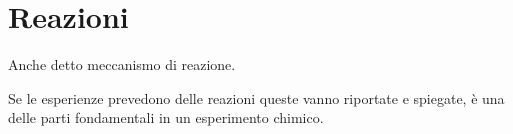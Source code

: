 \section{Reazioni}
Anche detto meccanismo di reazione.

Se le esperienze prevedono delle reazioni queste vanno riportate e spiegate, è una delle parti fondamentali in un esperimento chimico.






